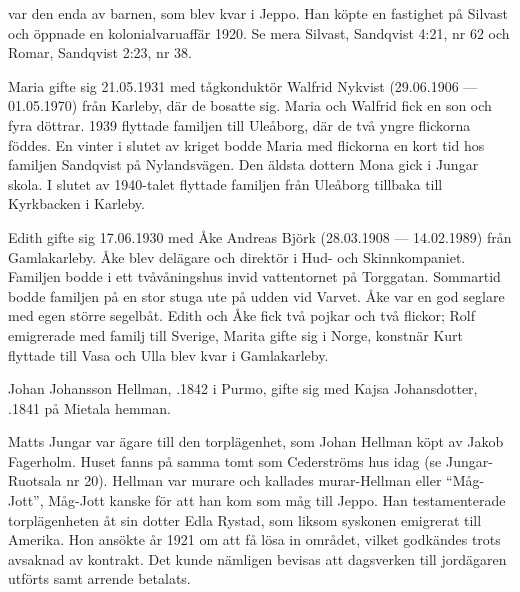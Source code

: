  var den enda av barnen, som blev kvar i Jeppo. Han köpte en fastighet på Silvast och öppnade en kolonialvaruaffär 1920. Se mera 	Silvast, Sandqvist 4:21, nr 62 och Romar, Sandqvist 2:23, nr 38.

Maria gifte sig 21.05.1931 med tågkonduktör Walfrid Nykvist (29.06.1906 --- 01.05.1970) från Karleby, där de bosatte sig. Maria och Walfrid fick en son och fyra döttrar. 1939 flyttade familjen till Uleåborg, där de två yngre flickorna föddes. En vinter i slutet av kriget bodde Maria med flickorna en kort tid hos familjen Sandqvist på Nylandsvägen. Den äldsta dottern Mona gick i Jungar skola. I slutet av 1940-talet flyttade familjen från Uleåborg tillbaka till Kyrkbacken i Karleby.

Edith gifte sig 17.06.1930 med Åke Andreas Björk (28.03.1908 --- 14.02.1989) från Gamlakarleby. Åke blev delägare och direktör i Hud- 	och Skinnkompaniet. Familjen bodde i ett tvåvåningshus invid 	vattentornet på Torggatan. Sommartid bodde familjen på en stor stuga ute på udden vid Varvet. Åke var en god seglare med egen större segelbåt. Edith och Åke fick två pojkar och två flickor; Rolf emigrerade med familj till Sverige, Marita gifte sig i Norge, konstnär Kurt flyttade till Vasa och Ulla blev kvar i Gamlakarleby.





Johan Johansson Hellman, .1842 i Purmo, gifte sig med Kajsa Johansdotter, .1841 på Mietala hemman.
\begin{jhchildren}
  \item {}
  \item {}
  \item {}
  \item {}
\end{jhchildren}
Matts Jungar var ägare till den torplägenhet, som Johan Hellman köpt av Jakob Fagerholm. Huset fanns på samma tomt som Cederströms hus idag (se Jungar-Ruotsala nr 20). Hellman var murare och kallades murar-Hellman eller ``Måg-Jott'', Måg-Jott kanske för att han kom som måg till Jeppo. Han testamenterade torplägenheten åt sin dotter Edla Rystad, som liksom syskonen emigrerat till Amerika. Hon ansökte år 1921 om att få lösa in området, vilket godkändes trots avsaknad av kontrakt. Det kunde nämligen bevisas att dagsverken till jordägaren utförts samt arrende betalats.

